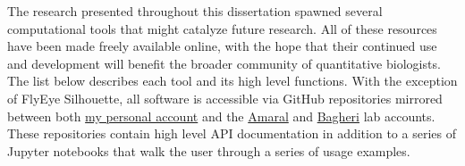 The research presented throughout this dissertation spawned several computational tools that might catalyze future research. All of these resources have been made freely available online, with the hope that their continued use and development will benefit the broader community of quantitative biologists. The list below describes each tool and its high level functions. With the exception of FlyEye Silhouette, all software is accessible via GitHub repositories mirrored between both \href{https://github.com/sebastianbernasek/}{my personal account} and the \href{https://github.com/amarallab}{Amaral} and \href{https://github.com/bagherilab}{Bagheri} lab accounts. These repositories contain high level API documentation in addition to a series of Jupyter notebooks that walk the user through a series of usage examples. 

